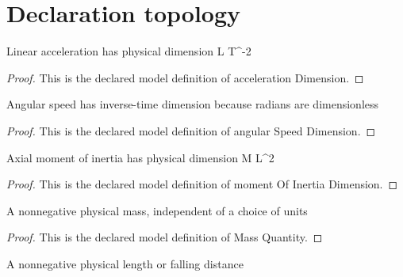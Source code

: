\section{Declaration topology}
\begin{definition}
  \label{def:physics:phyx-mini-0773:phyxminiproblems-problemphyxmini0773-accelerationdimension}
  Linear acceleration has physical dimension L T\textasciicircum{}-2
\end{definition}
\begin{proof}
  This is the declared model definition of acceleration Dimension.
\end{proof}
\begin{definition}
  \label{def:physics:phyx-mini-0773:phyxminiproblems-problemphyxmini0773-angularspeeddimension}
  Angular speed has inverse-time dimension because radians are dimensionless
\end{definition}
\begin{proof}
  This is the declared model definition of angular Speed Dimension.
\end{proof}
\begin{definition}
  \label{def:physics:phyx-mini-0773:phyxminiproblems-problemphyxmini0773-momentofinertiadimension}
  Axial moment of inertia has physical dimension M L\textasciicircum{}2
\end{definition}
\begin{proof}
  This is the declared model definition of moment Of Inertia Dimension.
\end{proof}
\begin{definition}
  \label{def:physics:phyx-mini-0773:phyxminiproblems-problemphyxmini0773-massquantity}
  A nonnegative physical mass, independent of a choice of units
\end{definition}
\begin{proof}
  This is the declared model definition of Mass Quantity.
\end{proof}
\begin{definition}
  \label{def:physics:phyx-mini-0773:phyxminiproblems-problemphyxmini0773-lengthquantity}
  A nonnegative physical length or falling distance
\end{definition}
